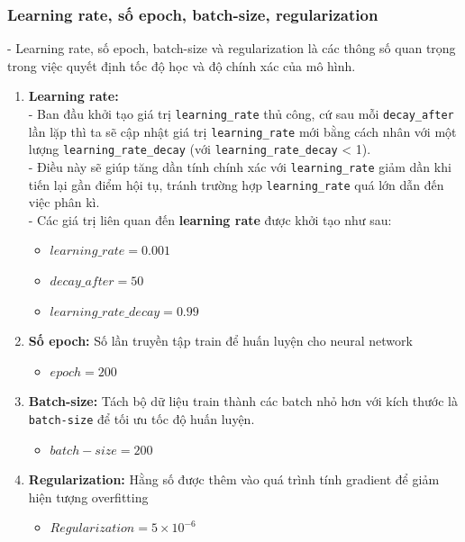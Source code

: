 \subsubsection{Learning rate, số epoch, batch-size, regularization}
- Learning rate, số epoch, batch-size và regularization là các thông số quan trọng trong việc quyết định tốc độ học và độ chính xác của mô hình.
\begin{enumerate}
    \item \textbf{Learning rate:} 
    \\- Ban đầu khởi tạo giá trị \texttt{learning\_rate} thủ công, cứ sau mỗi \texttt{decay\_after} lần lặp thì ta sẽ cập nhật giá trị \texttt{learning\_rate} mới bằng cách nhân với một lượng \texttt{learning\_rate\_decay} (với \texttt{learning\_rate\_decay} < 1). 
    \\- Điều này sẽ giúp tăng dần tính chính xác với \texttt{learning\_rate} giảm dần khi tiến lại gần điểm hội tụ, tránh trường hợp \texttt{learning\_rate} quá lớn dẫn đến việc phân kì. 
    \\- Các giá trị liên quan đến \textbf{learning rate} được khởi tạo như sau:
    \begin{itemize}
        \item $learning\_rate = 0.001$
        \item $decay\_after = 50$
        \item $learning\_rate\_decay = 0.99$
    \end{itemize}
    \item \textbf{Số epoch:} Số lần truyền tập train để huấn luyện cho neural network
    \begin{itemize}
        \item $epoch = 200$
    \end{itemize}
    \item \textbf{Batch-size:} Tách bộ dữ liệu train thành các batch nhỏ hơn với kích thước là \texttt{batch-size} để tối ưu tốc độ huấn luyện.
    \begin{itemize}
        \item $batch-size = 200$
    \end{itemize}
    \item \textbf{Regularization:} Hằng số được thêm vào quá trình tính gradient để giảm hiện tượng
overfitting 
    \begin{itemize}
        \item $Regularization = 5\times 10^{-6}$
    \end{itemize}
\end{enumerate}
